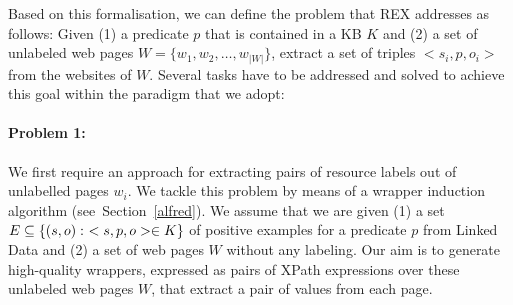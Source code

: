 Based on this formalisation, we can define the problem that REX addresses as follows: Given (1)
a predicate $p$ that is contained in a  \ac{KB} $K$ 
and (2) a set of unlabeled web pages $W = \{w_1, w_2, \ldots, w_{|W|}\}$,
extract a set of triples $<s_i, p, o_i>$ from the websites of $W$.
Several tasks have to be addressed and solved to achieve this goal within the paradigm that we adopt: %


\paragraph{Problem 1:}
We first require an approach for extracting pairs of resource labels out of unlabelled pages $w_i$. 
We tackle this problem by means of a wrapper induction algorithm (see~Section~\ref{alfred}). 
We assume that we are given (1) a set ${\examples} \subseteq \{(s,o):\ <s,p,o> \in K\}$ of positive examples for a predicate $p$ from Linked Data and (2) a set of web pages $W$ without any labeling. 
Our aim is to generate high-quality wrappers, expressed as pairs of XPath expressions over these unlabeled web pages $W$, that extract a pair of values from each page.
